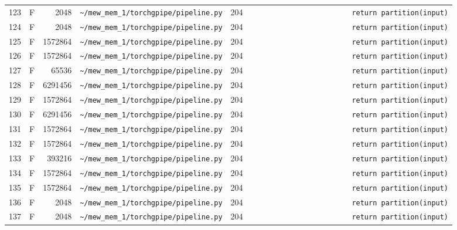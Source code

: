 \documentclass{article}
\begin{document}
\begin{longtable}{r l r p{6.5cm} r p{7.0cm}}
123 & F & 2048 & \lstinline|~/mew_mem_1/torchgpipe/pipeline.py| & 204 & \lstinline|                        return partition(input)| \\
124 & F & 2048 & \lstinline|~/mew_mem_1/torchgpipe/pipeline.py| & 204 & \lstinline|                        return partition(input)| \\
125 & F & 1572864 & \lstinline|~/mew_mem_1/torchgpipe/pipeline.py| & 204 & \lstinline|                        return partition(input)| \\
126 & F & 1572864 & \lstinline|~/mew_mem_1/torchgpipe/pipeline.py| & 204 & \lstinline|                        return partition(input)| \\
127 & F & 65536 & \lstinline|~/mew_mem_1/torchgpipe/pipeline.py| & 204 & \lstinline|                        return partition(input)| \\
128 & F & 6291456 & \lstinline|~/mew_mem_1/torchgpipe/pipeline.py| & 204 & \lstinline|                        return partition(input)| \\
129 & F & 1572864 & \lstinline|~/mew_mem_1/torchgpipe/pipeline.py| & 204 & \lstinline|                        return partition(input)| \\
130 & F & 6291456 & \lstinline|~/mew_mem_1/torchgpipe/pipeline.py| & 204 & \lstinline|                        return partition(input)| \\
131 & F & 1572864 & \lstinline|~/mew_mem_1/torchgpipe/pipeline.py| & 204 & \lstinline|                        return partition(input)| \\
132 & F & 1572864 & \lstinline|~/mew_mem_1/torchgpipe/pipeline.py| & 204 & \lstinline|                        return partition(input)| \\
133 & F & 393216 & \lstinline|~/mew_mem_1/torchgpipe/pipeline.py| & 204 & \lstinline|                        return partition(input)| \\
134 & F & 1572864 & \lstinline|~/mew_mem_1/torchgpipe/pipeline.py| & 204 & \lstinline|                        return partition(input)| \\
135 & F & 1572864 & \lstinline|~/mew_mem_1/torchgpipe/pipeline.py| & 204 & \lstinline|                        return partition(input)| \\
136 & F & 2048 & \lstinline|~/mew_mem_1/torchgpipe/pipeline.py| & 204 & \lstinline|                        return partition(input)| \\
137 & F & 2048 & \lstinline|~/mew_mem_1/torchgpipe/pipeline.py| & 204 & \lstinline|                        return partition(input)| \\

\end{longtable}
\end{document}
